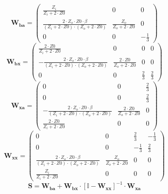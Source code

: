 \[ \mathbf{W_{ba}} = \left(\begin{smallmatrix} \frac{Z_i}{Z_i+2\cdot Z0} & 0 & 0 \\ \frac{2\cdot Z_o\cdot Z0\cdot \beta}{\left(Z_i+2\cdot Z0\right)\cdot\left(Z_o+2\cdot Z0\right)} & \frac{Z_o}{Z_o+2\cdot Z0} & 0 \\ 0 & 0 & -\frac{1}{3} \end{smallmatrix}\right) \]
\[ \mathbf{W_{bx}} = \left(\begin{smallmatrix} \frac{2\cdot Z0}{Z_i+2\cdot Z0} & 0 & 0 & 0 \\ -\frac{2\cdot Z_o\cdot Z0\cdot \beta}{\left(Z_i+2\cdot Z0\right)\cdot\left(Z_o+2\cdot Z0\right)} & \frac{2\cdot Z0}{Z_o+2\cdot Z0} & 0 & 0 \\ 0 & 0 & \frac{2}{3} & \frac{2}{3} \end{smallmatrix}\right) \]
\[ \mathbf{W_{xa}} = \left(\begin{smallmatrix} 0 & 0 & \frac{2}{3} \\ 0 & 0 & \frac{2}{3} \\ -\frac{2\cdot Z_o\cdot Z0\cdot \beta}{\left(Z_i+2\cdot Z0\right)\cdot\left(Z_o+2\cdot Z0\right)} & \frac{2\cdot Z0}{Z_o+2\cdot Z0} & 0 \\ \frac{2\cdot Z0}{Z_i+2\cdot Z0} & 0 & 0 \end{smallmatrix}\right) \]
\[ \mathbf{W_{xx}} = \left(\begin{smallmatrix} 0 & 0 & \frac{2}{3} & -\frac{1}{3} \\ 0 & 0 & -\frac{1}{3} & \frac{2}{3} \\ \frac{2\cdot Z_o\cdot Z0\cdot \beta}{\left(Z_i+2\cdot Z0\right)\cdot\left(Z_o+2\cdot Z0\right)} & \frac{Z_o}{Z_o+2\cdot Z0} & 0 & 0 \\ \frac{Z_i}{Z_i+2\cdot Z0} & 0 & 0 & 0 \end{smallmatrix}\right) \]
\[ \mathbf{S}=\mathbf{W_{ba}}+\mathbf{W_{bx}}\cdot\left[ \mathbb{I}  -\mathbf{W_{xx}}\right]^{-1}\cdot\mathbf{W_{xa}} \]

